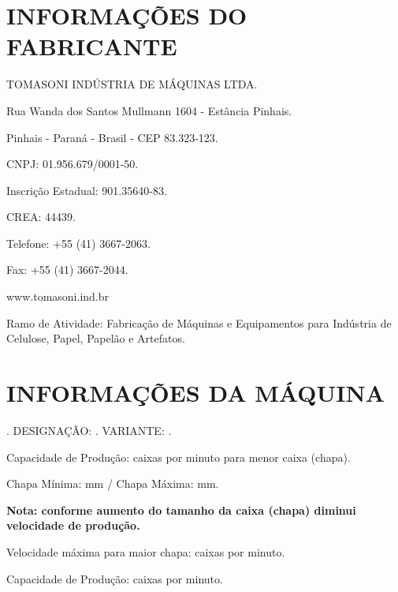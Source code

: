 \thispagestyle{fancy}

\vspace*{40 pt}

\section{\large{INFORMAÇÕES DO FABRICANTE}}

TOMASONI INDÚSTRIA DE MÁQUINAS LTDA.

Rua Wanda dos Santos Mullmann 1604 - Estância Pinhais.

Pinhais - Paraná - Brasil - CEP 83.323-123.

CNPJ: 01.956.679/0001-50.

Inscrição Estadual: 901.35640-83.

CREA: 44439.

Telefone: +55 (41) 3667-2063.

Fax: +55 (41) 3667-2044.

www.tomasoni.ind.br

Ramo de Atividade: Fabricação de Máquinas e Equipamentos para Indústria de Celulose, Papel, Papelão e Artefatos.

\section{\large{INFORMAÇÕES DA MÁQUINA}}

\machineName \space. DESIGNAÇÃO: \machineShortName. VARIANTE: \variant.

\ifmachineType

Capacidade de Produção: \productionCapacityminimumSheet \space caixas por minuto para menor caixa (chapa).

Chapa Mínima: \minimumSheet \space mm / Chapa Máxima: \maximumSheet \space mm.

\textbf{Nota: conforme aumento do tamanho da caixa (chapa) diminui velocidade de produção.}

Velocidade máxima para maior chapa: \productionCapacitymaximumSheet \space caixas por minuto.

\else

Capacidade de Produção: \productionCapacityminimumSheet \space caixas por minuto.

\fi



